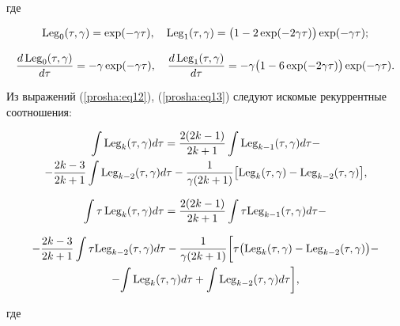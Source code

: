 где

$${\rm Leg}_0  ( \tau , \gamma  )=\exp(-\gamma \tau ), \quad

{\rm Leg}_1  (\tau , \gamma  )=\bigl( 1-2\exp({-2\gamma \tau })  \bigr)\exp(-\gamma \tau );$$

$$\frac{d\,{\rm Leg}_0  ( \tau , \gamma  )}{d\tau }=-\gamma \exp(-\gamma \tau ), \quad

\frac{d\,{\rm Leg}_1  ( \tau , \gamma  )}{d\tau}=-\gamma \bigl( 1-6\exp(-2\gamma \tau )  \bigr) \exp(-\gamma \tau ).$$

Из выражений (\ref{prosha:eq12}), (\ref{prosha:eq13}) следуют искомые рекуррентные соотношения:

\begin{multline*}

\int {\rm Leg}_k  ( \tau , \gamma  )d\tau  =

\frac{2 (2k-1)}{2k+1} \int {\rm Leg}_{k-1}  ( \tau , \gamma  )d\tau - \\

- \frac{2k-3}{2k+1}\int {\rm Leg}_{k-2}  ( \tau , \gamma )d\tau

-\frac{1}{\gamma (2k+1)} \bigl[ {\rm Leg}_k  ( \tau, \gamma   )-{\rm Leg}_{k-2}  ( \tau , \gamma  ) \bigr ],

\end{multline*}

\begin{multline*}

\int \tau \,{\rm Leg}_k  ( \tau , \gamma  )d\tau  =\frac{2(2k-1)}{2k+1}

\int \tau {\rm Leg}_{k-1}  ( \tau , \gamma  )d\tau  - \\ \end{multline*}

\begin{multline*}

- \frac{2k-3}{2k+1}\int \tau {\rm Leg}_{k-2}  ( \tau , \gamma  )d\tau  -

\frac{1}{\gamma (2k+1)} \biggl[ \tau \bigl( {\rm Leg}_k  ( \tau , \gamma  )- {\rm Leg}_{k-2}  ( \tau , \gamma  )  \bigr)   - \\

- {\int {{\rm Leg}_k  ( \tau , \gamma  )d\tau }

+\int {{\rm Leg}_{k-2}  ( \tau , \gamma  )d\tau } }  \biggr],

\end{multline*}

где

